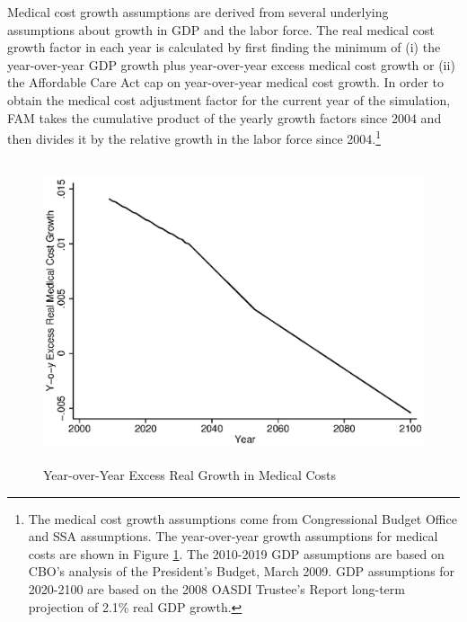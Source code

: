 \noindent Medical cost growth assumptions are derived from several underlying assumptions about growth in GDP and the labor force.
The real medical cost growth factor in each year is calculated by first finding the minimum of (i) the year-over-year GDP growth plus year-over-year excess medical cost growth or (ii) the Affordable Care Act cap on year-over-year medical cost growth. In order to obtain the medical cost adjustment factor for the current year of the simulation, FAM takes the cumulative product of the yearly growth factors since 2004 and then divides it by the relative growth in the labor force since 2004.\footnote{The medical cost growth assumptions come from Congressional Budget Office and SSA assumptions.
The year-over-year growth assumptions for medical costs are shown in Figure \ref{figure:medgrowth_yearly}.
The 2010-2019 GDP assumptions are based on CBO's analysis of the President's Budget, March 2009.
GDP assumptions for 2020-2100 are based on the 2008 OASDI Trustee's Report long-term projection of 2.1\% real GDP growth.} \\


\begin{figure}
\caption{Year-over-Year Excess Real Growth in Medical Costs} \label{figure:medgrowth_yearly}
 \centering
	 \includegraphics[height=3.5in]{AppOutput/Health/medgrowth_yearly}
\end{figure}

